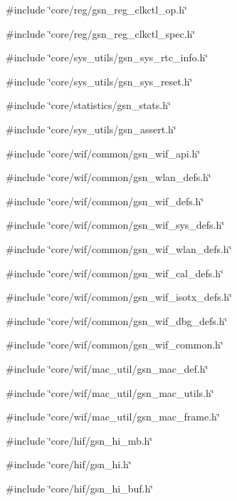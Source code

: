 {\ttfamily \#include \char`\"{}core/reg/gsn\_\-reg\_\-clkctl\_\-op.h\char`\"{}}\par
{\ttfamily \#include \char`\"{}core/reg/gsn\_\-reg\_\-clkctl\_\-spec.h\char`\"{}}\par
{\ttfamily \#include \char`\"{}core/sys\_\-utils/gsn\_\-sys\_\-rtc\_\-info.h\char`\"{}}\par
{\ttfamily \#include \char`\"{}core/sys\_\-utils/gsn\_\-sys\_\-reset.h\char`\"{}}\par
{\ttfamily \#include \char`\"{}core/statistics/gsn\_\-stats.h\char`\"{}}\par
{\ttfamily \#include \char`\"{}core/sys\_\-utils/gsn\_\-assert.h\char`\"{}}\par
{\ttfamily \#include \char`\"{}core/wif/common/gsn\_\-wif\_\-api.h\char`\"{}}\par
{\ttfamily \#include \char`\"{}core/wif/common/gsn\_\-wlan\_\-defs.h\char`\"{}}\par
{\ttfamily \#include \char`\"{}core/wif/common/gsn\_\-wif\_\-defs.h\char`\"{}}\par
{\ttfamily \#include \char`\"{}core/wif/common/gsn\_\-wif\_\-sys\_\-defs.h\char`\"{}}\par
{\ttfamily \#include \char`\"{}core/wif/common/gsn\_\-wif\_\-wlan\_\-defs.h\char`\"{}}\par
{\ttfamily \#include \char`\"{}core/wif/common/gsn\_\-wif\_\-cal\_\-defs.h\char`\"{}}\par
{\ttfamily \#include \char`\"{}core/wif/common/gsn\_\-wif\_\-isotx\_\-defs.h\char`\"{}}\par
{\ttfamily \#include \char`\"{}core/wif/common/gsn\_\-wif\_\-dbg\_\-defs.h\char`\"{}}\par
{\ttfamily \#include \char`\"{}core/wif/common/gsn\_\-wif\_\-common.h\char`\"{}}\par
{\ttfamily \#include \char`\"{}core/wif/mac\_\-util/gsn\_\-mac\_\-def.h\char`\"{}}\par
{\ttfamily \#include \char`\"{}core/wif/mac\_\-util/gsn\_\-mac\_\-utils.h\char`\"{}}\par
{\ttfamily \#include \char`\"{}core/wif/mac\_\-util/gsn\_\-mac\_\-frame.h\char`\"{}}\par
{\ttfamily \#include \char`\"{}core/hif/gsn\_\-hi\_\-mb.h\char`\"{}}\par
{\ttfamily \#include \char`\"{}core/hif/gsn\_\-hi.h\char`\"{}}\par
{\ttfamily \#include \char`\"{}core/hif/gsn\_\-hi\_\-buf.h\char`\"{}}\par
